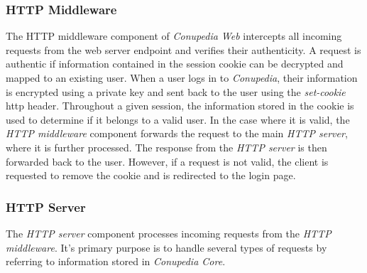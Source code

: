 \documentclass[conference]{IEEEtran}
\begin{document}
        \subsubsection{HTTP Middleware}
            The HTTP middleware component of \textit{Conupedia Web} intercepts all incoming requests from the web server endpoint and verifies their authenticity.
            A request is authentic if information contained in the session cookie can be decrypted and mapped to an existing user.
            When a user logs in to \textit{Conupedia}, their information is encrypted using a private key and sent back to the user using the \textit{set-cookie} http header.
            Throughout a given session, the information stored in the cookie is used to determine if it belongs to a valid user.
            In the case where it is valid, the \textit{HTTP middleware} component forwards the request to the main \textit{HTTP server}, where it is further processed.
            The response from the \textit{HTTP server} is then forwarded back to the user.
            However, if a request is not valid, the client is requested to remove the cookie and is redirected to the login page. 
            
        
        \subsubsection{HTTP Server}
            The \textit{HTTP server} component processes incoming requests from the \textit{HTTP middleware}.
            It's primary purpose is to handle several types of requests by referring to information stored in \textit{Conupedia Core}.
            
\end{document}
